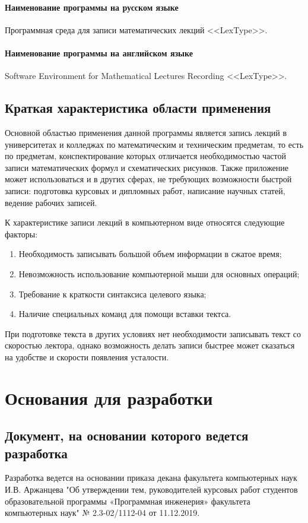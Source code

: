 \documentclass[techtask]{espd}
\begin{document}
\paragraph{Наименование программы на русском языке}
Программная среда для записи математических лекций <<LexType>>.
\paragraph{Наименование программы на английском языке}
Software Environment for Mathematical Lectures Recording <<LexType>>.

\subsection{Краткая характеристика области применения}
Основной областью применения данной программы является запись лекций в университетах и колледжах по математическим и техническим предметам, то есть по предметам, конспектирование которых отличается необходимостью частой записи математических формул и схематических рисунков. Также приложение может использоваться и в других сферах, не требующих возможности быстрой записи: подготовка курсовых и дипломных работ, написание научных статей, ведение рабочих записей.

К характеристике записи лекций в компьютерном виде относятся следующие факторы:

\begin{enumerate}
\item Необходимость записывать большой объем информации в сжатое время;
\item Невозможность использование компьютерной мыши для основных операций;
\item Требование к краткости синтаксиса целевого языка;
\item Наличие специальных команд для помощи вставки тектса.
\end{enumerate}

При подготовке текста в других условиях нет необходимости записывать текст со скоростью лектора, однако возможность делать записи быстрее может сказаться на удобстве и скорости появления усталости.

\section{Основания для разработки}
\subsection{Документ, на основании которого ведется разработка}
Разработка ведется на основании приказа декана факультета компьютерных наук И.В. Аржанцева "Об утверждении тем, руководителей курсовых работ студентов образовательной программы «Программная инженерия» факультета компьютерных наук" № 2.3-02/1112-04 от 11.12.2019.
\end{document}
